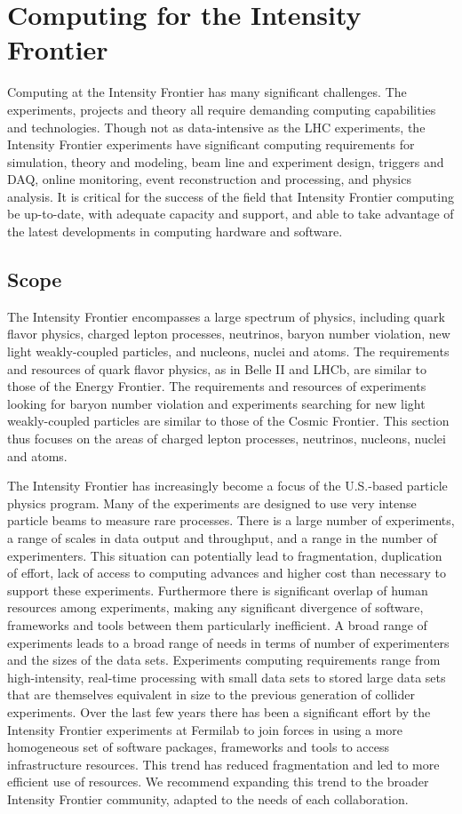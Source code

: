 \section{Computing for the Intensity Frontier}

Computing at the Intensity Frontier has many significant challenges. The
experiments, projects and theory all require demanding computing capabilities
and technologies.  Though not as data-intensive as the LHC experiments, the Intensity Frontier
experiments have significant computing requirements for simulation,  theory
and modeling, beam line and experiment design, triggers and DAQ, online
monitoring, event reconstruction and processing, and physics analysis.  It is
critical for the success of the field that Intensity Frontier computing be up-to-date, with adequate 
capacity and support, and able to take advantage of the latest
developments in computing hardware and software.

\subsection{Scope}
The Intensity Frontier encompasses a large spectrum of physics, including quark flavor
physics,  charged lepton processes, neutrinos, baryon number violation,  new
light weakly-coupled particles, and nucleons, nuclei and atoms.  The
requirements and resources of quark flavor physics, as in Belle II and LHCb,
are similar to those of the Energy Frontier. The requirements and
resources of  experiments looking for baryon number violation and  experiments
searching for new light weakly-coupled particles are similar to  those of the
Cosmic Frontier.  This section thus focuses on the areas of charged lepton processes,  neutrinos, nucleons,
nuclei and atoms.

The Intensity Frontier has increasingly become a focus of the U.S.-based particle physics program. Many  of
the experiments are designed to use very intense particle beams to measure
rare processes. There is a large number of experiments, a range of scales
in data output and throughput, and a range in the number of experimenters.
This situation can potentially lead to fragmentation, duplication of effort, lack of
access to computing advances and higher cost than necessary to support these experiments. 
Furthermore there is significant overlap of human resources among experiments, making any significant
divergence of  software, frameworks and tools between them particularly
inefficient.  A broad range of experiments leads to a broad range of needs in 
terms of number of experimenters and the sizes of the data sets. Experiments 
computing requirements range from high-intensity, real-time processing with 
small data sets to stored large data sets that are themselves equivalent in 
size to the previous generation of collider experiments. Over the
last few years there has been a significant effort by the Intensity Frontier experiments at
Fermilab to join forces in using a more homogeneous set of software packages,
frameworks and tools to access infrastructure resources. This trend has
reduced fragmentation and led to more efficient use of resources. We recommend
expanding this trend to the broader Intensity Frontier community, adapted to the needs of each
collaboration.

